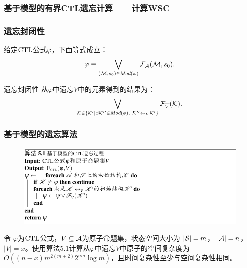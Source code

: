 \documentclass[9pt, CJK]{beamer}
\begin{document}
\begin{frame}
	\frametitle{基于模型的有界CTL遗忘计算——{\footnotesize 计算WSC}}
	{\footnotesize 
	}
\end{frame}


\begin{frame}
	\frametitle{遗忘封闭性}
	{\footnotesize 
		\begin{lemma}\label{lem:models:formula}
				给定$\textrm{CTL}$公式$\varphi$，下面等式成立：
				\begin{equation*}
					\varphi\equiv \bigvee_{({\cal M}, s_0)\in\textit{Mod}(\varphi)}{\cal F}_{\cal A}({\cal M}, s_0).
				\end{equation*}
			\end{lemma}
			\begin{block}{遗忘封闭性}
				从$\varphi$中遗忘$V$中的元素得到的结果为：
				\begin{equation*}
					\bigvee_{{\cal K}\in  \{{\cal K}'\mid \exists {\cal K}''\in\textit{Mod}(\phi),\ {\cal K}''\leftrightarrow_V{\cal K}'\}} {\cal F}_{\overline V}({\cal K}).
				\end{equation*}
		\end{block}
	}
\end{frame}

\begin{frame}
	\frametitle{基于模型的遗忘算法}
	{\footnotesize 
		\begin{figure}
			\includegraphics[scale=0.45]{figures/model-basedAlg}
		\end{figure}
		
		\begin{proposition}\label{pro:time:alg1}
			令 $\varphi$为$\textrm{CTL}$公式，$V\subseteq {\cal A}$为原子命题集，状态空间大小为 $|{\cal S}|=m$， $|{\cal A}|=n$，$|V|=x$。使用算法5.1计算从$\varphi$中遗忘$V$中原子的空间复杂度为 $O((n-x)m^{2(m+2)}2^{nm}  \log m)$，且时间复杂性至少与空间复杂性相同。
		\end{proposition}
	}
\end{frame}
\end{document}
